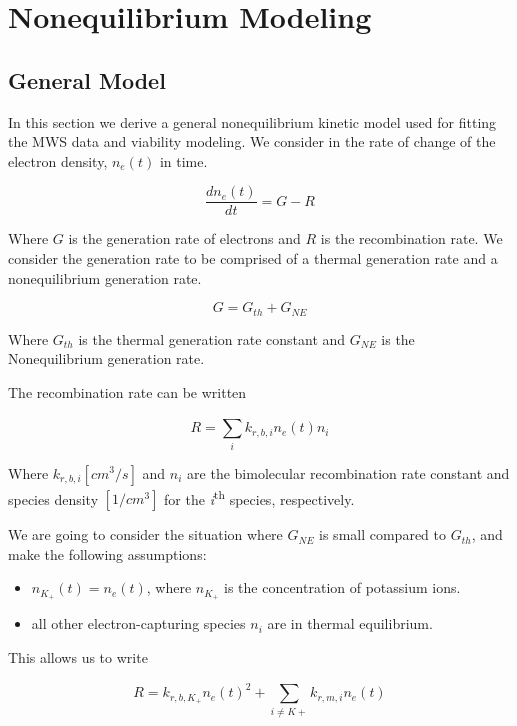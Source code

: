 \section{Nonequilibrium Modeling}

\subsection{General Model}

In this section we derive a general nonequilibrium kinetic model used for fitting the MWS data and viability modeling. We consider in the rate of change of the electron density, \(n_{e}(t)\) in time. 

\begin{equation}
  \label{eq:start_deqn}
\frac{dn_{e}(t)}{dt} = G - R
\end{equation}

Where \(G\) is the generation rate of electrons and \(R\) is the recombination rate. We consider the generation rate to be comprised of a thermal generation rate and a nonequilibrium generation rate.

\begin{equation}
  G = G_{th} + G_{NE}
\end{equation}

Where \(G_{th}\) is the thermal generation rate constant and \(G_{NE}\) is the Nonequilibrium generation rate. 

The recombination rate can be written

\begin{equation}
  R = \sum_{i}^{}k_{r, b, i}n_{e}(t)n_{i}
\end{equation}

Where $k_{r, b, i} [cm^3/s]$  and $n_i$ are the bimolecular recombination rate constant and species density $[1/cm^3]$ for the \emph{i}\textsuperscript{th} species, respectively. 

We are going to consider the situation where $G_{NE}$ is small compared to $G_{th}$, and make the following assumptions:

\begin{itemize}
\item $n_{K_+}(t) = n_{e}(t)$, where $n_{K_+}$ is the concentration of potassium ions. 
\item all other electron-capturing species $n_i$ are in thermal equilibrium.
\end{itemize}

This allows us to write

\begin{equation}
R = k_{r, b, K_{+}}n_{e}(t)^2 + \sum_{i \neq K+}^{}k_{r, m, i}n_{e}(t)
\end{equation}

